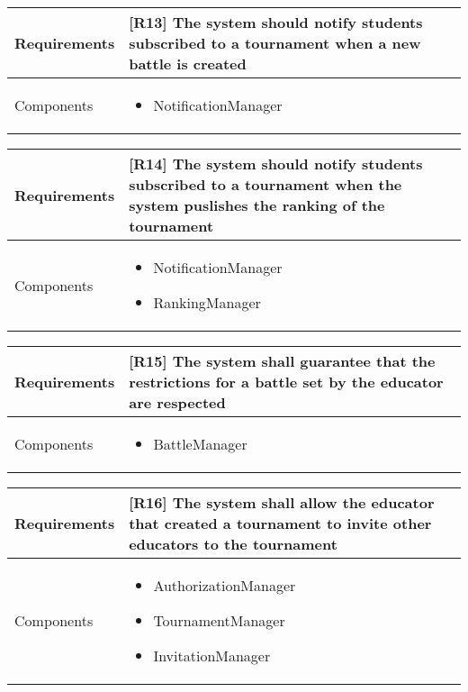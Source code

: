 \begin{tabular}{|p{3cm}|p{10cm}|}
    \hline
    Requirements & [R13] The system should notify students subscribed to a tournament when a new battle is created \\
    \hline
    Components & 
    \begin{itemize}
        \item NotificationManager
    \end{itemize} 
    \\
    \hline
\end{tabular}

\begin{tabular}{|p{3cm}|p{10cm}|}
    \hline
    Requirements & [R14] The system should notify students subscribed to a tournament when the system puslishes the ranking of the tournament \\
    \hline
    Components & 
    \begin{itemize}
        \item NotificationManager
        \item RankingManager
    \end{itemize} 
    \\
    \hline
\end{tabular}

\begin{tabular}{|p{3cm}|p{10cm}|}
    \hline
    Requirements & [R15] The system shall guarantee that the restrictions for a battle set by the educator are respected \\
    \hline
    Components & 
    \begin{itemize}
        \item BattleManager
    \end{itemize} 
    \\
    \hline
\end{tabular}

\begin{tabular}{|p{3cm}|p{10cm}|}
    \hline
    Requirements & [R16] The system shall allow the educator that created a tournament to invite other educators to the tournament \\
    \hline
    Components & 
    \begin{itemize}
        \item AuthorizationManager
        \item TournamentManager
        \item InvitationManager
    \end{itemize} 
    \\
    \hline
\end{tabular}


